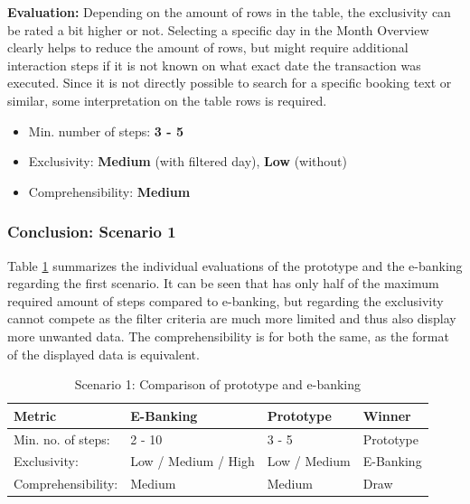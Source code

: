 \textbf{Evaluation:} Depending on the amount of rows in the table, the exclusivity can be rated a bit higher or not. Selecting a specific day in the Month Overview clearly helps to reduce the amount of rows, but might require additional interaction steps if it is not known on what exact date the transaction was executed. Since it is not directly possible to search for a specific booking text or similar, some interpretation on the table rows is required.
\begin{itemize}[noitemsep,nolistsep]
	\item Min. number of steps: \textbf{3 - 5}
	\item Exclusivity: \textbf{Medium} (with filtered day), \textbf{Low} (without)
	\item Comprehensibility: \textbf{Medium}
\end{itemize}



\subsubsection{Conclusion: Scenario 1}

Table \ref{tbl:scenarioonecomparison} summarizes the individual evaluations of the prototype and the e-banking regarding the first scenario. It can be seen that has only half of the maximum required amount of steps compared to e-banking, but regarding the exclusivity cannot compete as the filter criteria are much more limited and thus also display more unwanted data. The comprehensibility is for both the same, as the format of the displayed data is equivalent.
\begin{table}[h]
	\begin{center}
		\begin{tabular}{ | p{3.2cm} | p{3.8cm} | p{3.5cm} | p{2.5cm} | }
			\hline
			\textbf{Metric} & \textbf{E-Banking} & \textbf{Prototype} & \textbf{Winner} \\
			\hline
				Min. no. of steps: & 2 - 10 & 3 - 5 & Prototype \\
			\hline
				Exclusivity: & Low / Medium / High & Low / Medium & E-Banking \\
			\hline
				Comprehensibility: & Medium & Medium & Draw \\
			\hline
		\end{tabular}
		\caption{Scenario 1: Comparison of prototype and e-banking}
		\label{tbl:scenarioonecomparison}
	\end{center}
\end{table}


